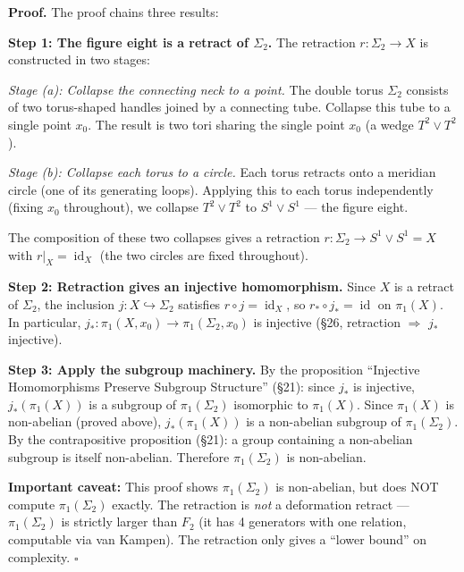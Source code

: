 \documentclass[11pt]{report}
\renewenvironment{proof}[1][Proof]{\noindent\textbf{#1.} }{\hfill$\square$\par\vspace{5pt}}
\begin{document}
\begin{proof}
The proof chains three results:

\textbf{Step 1: The figure eight is a retract of $\Sigma_2$.} The retraction $r: \Sigma_2 \to X$ is constructed in two stages:

\textit{Stage (a): Collapse the connecting neck to a point.} The double torus $\Sigma_2$ consists of two torus-shaped handles joined by a connecting tube. Collapse this tube to a single point $x_0$. The result is two tori sharing the single point $x_0$ (a wedge $T^2 \vee T^2$).

\textit{Stage (b): Collapse each torus to a circle.} Each torus retracts onto a meridian circle (one of its generating loops). Applying this to each torus independently (fixing $x_0$ throughout), we collapse $T^2 \vee T^2$ to $S^1 \vee S^1$ --- the figure eight.

The composition of these two collapses gives a retraction $r: \Sigma_2 \to S^1 \vee S^1 = X$ with $r|_X = \operatorname{id}_X$ (the two circles are fixed throughout).

\textbf{Step 2: Retraction gives an injective homomorphism.} Since $X$ is a retract of $\Sigma_2$, the inclusion $j: X \hookrightarrow \Sigma_2$ satisfies $r \circ j = \operatorname{id}_X$, so $r_* \circ j_* = \operatorname{id}$ on $\pi_1(X)$. In particular, $j_*: \pi_1(X, x_0) \to \pi_1(\Sigma_2, x_0)$ is injective (\S 26, retraction $\Rightarrow$ $j_*$ injective).

\textbf{Step 3: Apply the subgroup machinery.} By the proposition ``Injective Homomorphisms Preserve Subgroup Structure'' (\S 21): since $j_*$ is injective, $j_*(\pi_1(X))$ is a subgroup of $\pi_1(\Sigma_2)$ isomorphic to $\pi_1(X)$. Since $\pi_1(X)$ is non-abelian (proved above), $j_*(\pi_1(X))$ is a non-abelian subgroup of $\pi_1(\Sigma_2)$. By the contrapositive proposition (\S 21): a group containing a non-abelian subgroup is itself non-abelian. Therefore $\pi_1(\Sigma_2)$ is non-abelian.

\textbf{Important caveat:} This proof shows $\pi_1(\Sigma_2)$ is non-abelian, but does NOT compute $\pi_1(\Sigma_2)$ exactly. The retraction is \emph{not} a deformation retract --- $\pi_1(\Sigma_2)$ is strictly larger than $F_2$ (it has 4 generators with one relation, computable via van Kampen). The retraction only gives a ``lower bound'' on complexity.
\end{proof}
\end{document}
